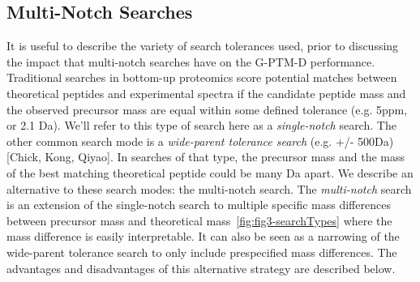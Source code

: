 \documentclass[journal=jprobs,manuscript=article]{achemso}
\begin{document}
\newpage

\subsection{Multi-Notch Searches}

It is useful to describe the variety of search tolerances used, prior to discussing the impact that multi-notch searches have on the G-PTM-D performance.
Traditional searches in bottom-up proteomics score potential matches between theoretical peptides and experimental spectra if the candidate peptide mass and the observed precursor mass are equal within some defined tolerance (e.g. 5ppm, or 2.1 Da).
We'll refer to this type of search here as a \textit{single-notch} search.
The other common search mode is a \textit{wide-parent tolerance search} (e.g. +/- 500Da)[Chick, Kong, Qiyao].
In searches of that type, the precursor mass and the mass of the best matching theoretical peptide could be many Da apart.
We describe an alternative to these search modes: the multi-notch search.
The \textit{multi-notch} search is an extension of the single-notch search to multiple specific mass differences between precursor mass and theoretical mass~\ref{fig:fig3-searchTypes} where the mass difference is easily interpretable.
It can also be seen as a narrowing of the wide-parent tolerance search to only include prespecified mass differences.
The advantages and disadvantages of this alternative strategy are described below.
\end{document}
